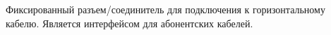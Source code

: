 Фиксированный разъем/соединитель для подключения к
горизонтальному кабелю.  Является
интерфейсом для абонентских кабелей.